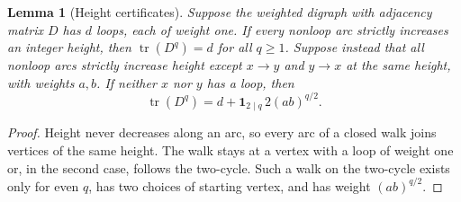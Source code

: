 \documentclass[10pt]{article}
\numberwithin{equation}{section}
\newtheorem{lemma}[lemma]{Lemma}\aliascntresetthe{lemma}
\begin{document}
\begin{lemma}[Height certificates]\label{finite:lem:transfer-height}
Suppose the weighted digraph with adjacency matrix $D$ has $d$ loops, each of weight one. If every nonloop arc strictly increases an integer height, then $\operatorname{tr}(D^q)=d$ for all $q\ge1$. Suppose instead that all nonloop arcs strictly increase height except $x\to y$ and $y\to x$ at the same height, with weights $a,b$. If neither $x$ nor $y$ has a loop, then
\[
 \operatorname{tr}(D^q)=d+\mathbf1_{2\mid q}\,2(ab)^{q/2}.
\]
\end{lemma}
\begin{proof}
Height never decreases along an arc, so every arc of a closed walk joins vertices of the same height. The walk stays at a vertex with a loop of weight one or, in the second case, follows the two-cycle. Such a walk on the two-cycle exists only for even $q$, has two choices of starting vertex, and has weight $(ab)^{q/2}$.
\end{proof}
\end{document}
